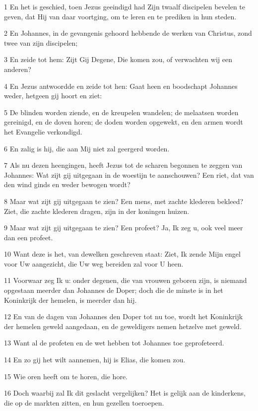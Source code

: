 \par 1 En het is geschied, toen Jezus geeindigd had Zijn twaalf discipelen bevelen te geven, dat Hij van daar voortging, om te leren en te prediken in hun steden.
\par 2 En Johannes, in de gevangenis gehoord hebbende de werken van Christus, zond twee van zijn discipelen;
\par 3 En zeide tot hem: Zijt Gij Degene, Die komen zou, of verwachten wij een anderen?
\par 4 En Jezus antwoordde en zeide tot hen: Gaat heen en boodschapt Johannes weder, hetgeen gij hoort en ziet:
\par 5 De blinden worden ziende, en de kreupelen wandelen; de melaatsen worden gereinigd, en de doven horen; de doden worden opgewekt, en den armen wordt het Evangelie verkondigd.
\par 6 En zalig is hij, die aan Mij niet zal geergerd worden.
\par 7 Als nu dezen heengingen, heeft Jezus tot de scharen begonnen te zeggen van Johannes: Wat zijt gij uitgegaan in de woestijn te aanschouwen? Een riet, dat van den wind ginds en weder bewogen wordt?
\par 8 Maar wat zijt gij uitgegaan te zien? Een mens, met zachte klederen bekleed? Ziet, die zachte klederen dragen, zijn in der koningen huizen.
\par 9 Maar wat zijt gij uitgegaan te zien? Een profeet? Ja, Ik zeg u, ook veel meer dan een profeet.
\par 10 Want deze is het, van dewelken geschreven staat: Ziet, Ik zende Mijn engel voor Uw aangezicht, die Uw weg bereiden zal voor U heen.
\par 11 Voorwaar zeg Ik u: onder degenen, die van vrouwen geboren zijn, is niemand opgestaan meerder dan Johannes de Doper; doch die de minste is in het Koninkrijk der hemelen, is meerder dan hij.
\par 12 En van de dagen van Johannes den Doper tot nu toe, wordt het Koninkrijk der hemelen geweld aangedaan, en de geweldigers nemen hetzelve met geweld.
\par 13 Want al de profeten en de wet hebben tot Johannes toe geprofeteerd.
\par 14 En zo gij het wilt aannemen, hij is Elias, die komen zou.
\par 15 Wie oren heeft om te horen, die hore.
\par 16 Doch waarbij zal Ik dit geslacht vergelijken? Het is gelijk aan de kinderkens, die op de markten zitten, en hun gezellen toeroepen.
